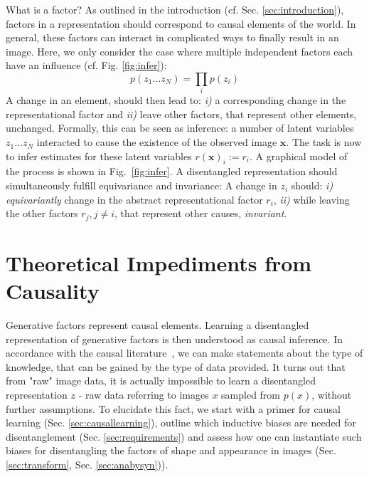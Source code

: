 		What is a factor? As outlined in the introduction (cf. Sec. \ref{sec:introduction}), factors in a representation should correspond to causal elements of the world.
		In general, these factors can interact in complicated ways to finally result in an image. Here, we only consider the case where multiple independent factors each have an influence (cf. Fig. \ref{fig:infer}):
		\begin{equation}\label{eq:independent}
			p(z_1 \ldots z_N) = \prod_i p(z_i)
		\end{equation}
		A change in an element, should then lead to: \emph{i)} a corresponding change in the representational factor and \emph{ii)} leave other factors, that represent other elements, unchanged.
		Formally, this can be seen as inference: a number of latent variables ${z_1}\ldots{z_N}$ interacted to cause the existence of the observed image $\mathbf{x}$. The task is now to infer estimates for these latent variables $r(\mathbf{x})_i:=r_i$. A graphical model of the process is shown in Fig.~\ref{fig:infer}.
		A disentangled representation should simultaneously fulfill equivariance and invariance: A change in ${z_i}$ should: \emph{i)} \textit{equivariantly} change in the abstract representational factor $r_i$, \emph{ii)} while leaving the other factors $r_j, j\neq i$, that represent other causes, \textit{invariant}.


\section{Theoretical Impediments from Causality}\label{sec:causality}


	Generative factors represent causal elements.
	Learning a disentangled representation of generative factors is then understood as causal inference.
	In accordance with the causal literature~\cite{pearl18impediments}, we can make statements about the type of knowledge, that can be gained by the type of data provided. It turns out that from "raw" image data, it is actually impossible to learn a disentangled representation $z$ - raw data referring to images $x$ sampled from $p(x)$, without further assumptions.
	To elucidate this fact, we start with a primer for causal learning (Sec. \ref{sec:causallearning}), outline which inductive biases are needed for disentanglement (Sec. \ref{sec:requirements}) and assess how one can instantiate such biases for disentangling the factors of shape and appearance in images (Sec. \ref{sec:transform}, Sec. \ref{sec:anabysyn})).

